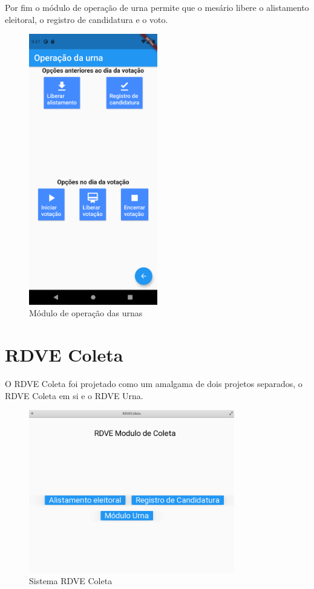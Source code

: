 Por fim o módulo de operação de urna permite que o mesário libere o alistamento eleitoral, o registro de candidatura e o voto. 

\begin{figure}[!htb]
	\centering
	\includegraphics[width=0.5\textwidth]{imagens/wallet3}
	\caption{Módulo de operação das urnas}
	\label{fig:wallet_operador}
\end{figure}
\clearpage

\section{RDVE Coleta}

O RDVE Coleta foi projetado como um amalgama de dois projetos separados, o RDVE Coleta em si e o RDVE Urna.

\begin{figure}[h!]
	\centering
	\includegraphics[width=0.8\textwidth]{imagens/coleta1}
	\caption{Sistema RDVE Coleta}
	\label{fig:coleta1}
\end{figure}

